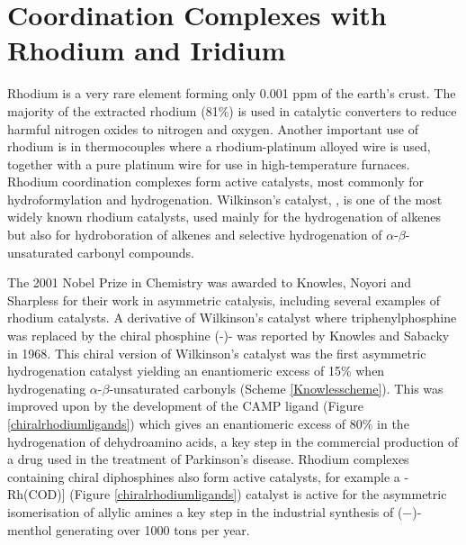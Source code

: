 
\chapter{Coordination Complexes with Rhodium and Iridium}
\label{ch:rhodium}

Rhodium is a very rare element forming only 0.001 ppm of the earth's crust.\cite{Enghag2004Rhabundance}  The majority of the extracted rhodium (81\%) is used in catalytic converters to reduce harmful nitrogen oxides to nitrogen and oxygen.  Another important use of rhodium is in thermocouples where a rhodium-platinum alloyed wire is used, together with a pure platinum wire for use in high-temperature furnaces.\cite{Enghag2004Rh}  Rhodium coordination complexes form active catalysts, most commonly for hydroformylation and hydrogenation.  Wilkinson's catalyst, , is one of the most widely known rhodium catalysts, used mainly for the hydrogenation of alkenes but also for hydroboration of alkenes and selective hydrogenation of $\alpha$-$\beta$-unsaturated carbonyl compounds.  

The 2001 Nobel Prize in Chemistry was awarded to Knowles,\cite{Knowles2002} Noyori\cite{Noyori2002} and Sharpless\cite{Sharpless2002} for their work in asymmetric catalysis, including several examples of rhodium catalysts.  A derivative of Wilkinson's catalyst where triphenylphosphine was replaced by the chiral phosphine (-)- was reported by Knowles and Sabacky in 1968\cite{Knowles1968}.  This chiral version of Wilkinson's catalyst was the first asymmetric hydrogenation catalyst yielding an enantiomeric excess of 15\% when hydrogenating $\alpha$-$\beta$-unsaturated carbonyls (Scheme \ref{Knowlesscheme}).  This was improved upon by the development of the CAMP ligand (Figure \ref{chiralrhodiumligands}) which gives an enantiomeric excess of 80\% in the hydrogenation of dehydroamino acids, a key step in the commercial production of   a drug used in the treatment of Parkinson's disease.\cite{Noyori2007}  Rhodium complexes containing chiral diphosphines also form active catalysts, for example a \iupac{[\cip{S}-BINAP}-Rh(COD)] (Figure \ref{chiralrhodiumligands}) catalyst is active for the asymmetric isomerisation of allylic amines a key step in the industrial synthesis of ($-$)-menthol generating over 1000 tons per year.\cite{Noyori2002}

